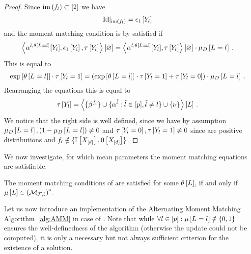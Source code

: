 \begin{proof}
    Since $\mathrm{im}\left(f_{l}\right)\subset[2]$ we have
    \begin{align*}
        {\mathrm{Id}}|_{\mathrm{im}\left(f_{l}\right)} = \epsilon_{1}\left[Y_{l}\right]
    \end{align*}
    and the moment matching condition is by  satisfied if
    \begin{align*}
        \left\langle \alpha^{l,\theta\left[L_{}=l_{}\right]}[Y_{l}], \epsilon_{1}\left[Y_{l}\right], \tau\left[Y_{l}\right]\right\rangle \left[ \varnothing \right]
        = \left\langle \alpha^{l,\theta\left[L_{}=l_{}\right]}[Y_{l}],\tau\left[Y_{l}\right]\right\rangle \left[ \varnothing \right] \cdot \mu_{D}\left[L_{}=l_{}\right] \, .
    \end{align*}
    This is equal to
    \begin{align*}
        \mathrm{exp}\left[\theta\left[L_{}=l_{}\right]\right] \cdot \tau\left[Y_{l}=1\right]
        = \left( \mathrm{exp}\left[\theta\left[L_{}=l_{}\right]\right] \cdot \tau\left[Y_{l}=1\right] + \tau\left[Y_{l}=0\right] \right) \cdot \mu_{D}\left[L_{}=l_{}\right] \, .
    \end{align*}
    Rearranging the equations this is equal to
    \begin{align*}
        \tau\left[Y_{l}\right]
        = \left\langle \{\beta^{f_{l}}\}
        \cup\{\alpha^{\tilde{l}} : \tilde{l} \in [p], \tilde{l}\neq l\}
        \cup\{\nu\}\right\rangle \left[ L \right] \, .
    \end{align*}
    We notice that the right side is well defined, since we have by assumption $\mu_{D}\left[L_{}=l_{}\right], (1- \mu_{D}\left[L_{}=l_{}\right]) \neq 0$ and $\tau\left[Y_{l}=0\right], \tau\left[Y_{l}=1\right] \neq 0$ since \MarkovLogicNetworks{} are positive distributions and $f_{l} \notin \{\mathbb{I}\left[X_{[d]}\right],0\left[X_{[d]}\right]\}$.
\end{proof}

We now investigate, for which mean parameters the moment matching equations are satisfiable.

The moment matching conditions of  are satisfied for some $\theta\left[L\right]$, if and only if $\mu\left[L\right]\in{\left(\mathcal{M}_{\mathcal{F},\mathbb{I}}\right)}^{\circ}$.


Let us now introduce an implementation of the Alternating Moment Matching Algorithm~\ref{alg:AMM} in case of \MarkovLogicNetworks{}.
Note that while $\forall{l\in[p]}:{\mu\left[L_{}=l_{}\right]\notin\{0,1\}}$ ensures the well-definedness of the algorithm (otherwise the update could not be computed), it is only a necessary but not always sufficient criterion for the existence of a solution.


